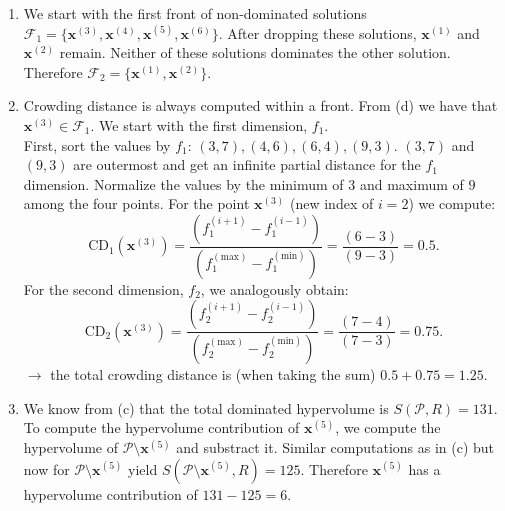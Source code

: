 \documentclass[a4paper]{article}
\begin{document}
{\begin{enumerate}
  For the four rectangles from left to right:
  \begin{itemize}
    \item $(4-3) \cdot (15-7) = 8$
    \item $(6-4) \cdot (15-6) = 18$
    \item $(9-6) \cdot (15-4) = 33$
    \item $(15-9) \cdot (15-3) = 72$
  \end{itemize}
  $\rightarrow S(\mathcal{P}, R) = 8+18+33+72 = 131$.
\item We start with the first front of non-dominated solutions $\mathcal{F}_{1} = \{\mathbf{x}^{(3)}, \mathbf{x}^{(4)}, \mathbf{x}^{(5)}, \mathbf{x}^{(6)}\}$.
  After dropping these solutions, $\mathbf{x}^{(1)}$ and $\mathbf{x}^{(2)}$ remain. Neither of these solutions dominates the other solution.
  Therefore $\mathcal{F}_{2} = \{\mathbf{x}^{(1)}, \mathbf{x}^{(2)}\}$.
\item Crowding distance is always computed within a front. From (d) we have that $\mathbf{x}^{(3)} \in \mathcal{F}_{1}$.
  We start with the first dimension, $f_{1}$.\\
  First, sort the values by $f_{1}$: $(3,7),(4,6),(6,4),(9,3)$.
  $(3, 7)$ and $(9, 3)$ are outermost and get an infinite partial distance for the $f_{1}$ dimension.
  Normalize the values by the minimum of $3$ and maximum of $9$ among the four points.
  For the point $\mathbf{x}^{(3)}$ (new index of $i = 2$) we compute:
  $$\mathrm{CD}_{1}(\mathbf{x}^{(3)}) = \frac{(f_{1}^{(i+1)} - f_{1}^{(i-1)})}{(f_{1}^{(\mathrm{max})} - f_{1}^{(\mathrm{min})})} = \frac{(6 - 3)}{(9 - 3)} = 0.5.$$
  For the second dimension, $f_{2}$, we analogously obtain:
  $$\mathrm{CD}_{2}(\mathbf{x}^{(3)}) = \frac{(f_{2}^{(i+1)} - f_{2}^{(i-1)})}{(f_{2}^{(\mathrm{max})} - f_{2}^{(\mathrm{min})})} = \frac{(7 - 4)}{(7 - 3)} = 0.75.$$
  $\rightarrow$ the total crowding distance is (when taking the sum) $0.5 + 0.75 = 1.25$.
\item We know from (c) that the total dominated hypervolume is $S(\mathcal{P}, R) = 131$.
  To compute the hypervolume contribution of $\mathbf{x}^{(5)}$, we compute the hypervolume of $\mathcal{P} \setminus \mathbf{x}^{(5)}$ and substract it.
  Similar computations as in (c) but now for $\mathcal{P} \setminus \mathbf{x}^{(5)}$ yield $S(\mathcal{P} \setminus \mathbf{x}^{(5)}, R) = 125$. Therefore $\mathbf{x}^{(5)}$ has a hypervolume contribution of $131 - 125 = 6$.
\end{enumerate}
}
\end{document}
